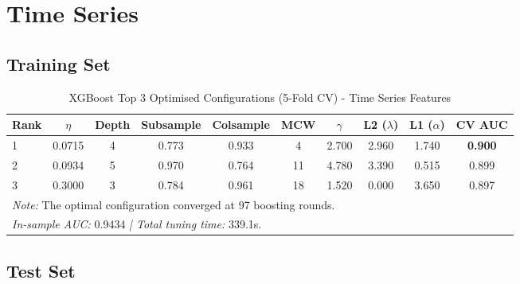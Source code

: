 \documentclass{report}\usepackage[]{graphicx}\usepackage[]{xcolor}
\begin{document}

\section{Time Series}

\subsection{Training Set}

\begin{table}[h]
    \centering
    \caption{XGBoost Top 3 Optimised Configurations (5-Fold CV) - Time Series Features}
    \label{tab:xgb_leaderboard_ts}
    \begin{tabular}{lccccccccc}
        \hline
        \textbf{Rank} & \textbf{$\eta$} & \textbf{Depth} & \textbf{Subsample} & \textbf{Colsample} & \textbf{MCW} & \textbf{$\gamma$} & \textbf{L2 ($\lambda$)} & \textbf{L1 ($\alpha$)} & \textbf{CV AUC} \\
        \hline
        1 & 0.0715 & 4 & 0.773 & 0.933 & 4  & 2.700 & 2.960 & 1.740 & \textbf{0.900} \\
        2 & 0.0934 & 5 & 0.970 & 0.764 & 11 & 4.780 & 3.390 & 0.515 & 0.899 \\
        3 & 0.3000 & 3 & 0.784 & 0.961 & 18 & 1.520 & 0.000 & 3.650 & 0.897 \\
        \hline
        \multicolumn{10}{l}{\footnotesize \textit{Note:} The optimal configuration converged at 97 boosting rounds.} \\
        \multicolumn{10}{l}{\footnotesize \textit{In-sample AUC:} 0.9434 \textit{ | Total tuning time:} 339.1s.} \\
    \end{tabular}
\end{table}

\subsection{Test Set}
\end{document}
